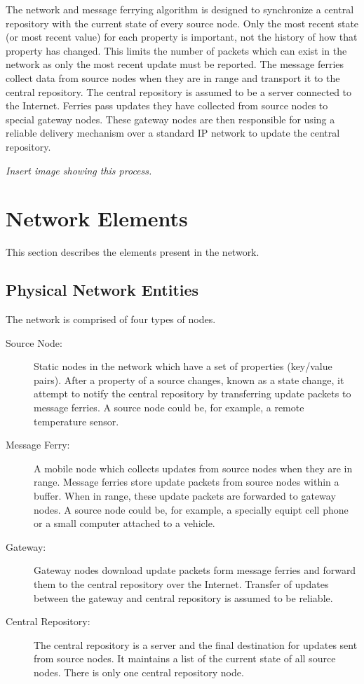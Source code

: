 The network and message ferrying algorithm is designed to synchronize a central repository with the current state of every source node.
Only the most recent state (or most recent value) for each property is important, not the history of how that property has changed.
This limits the number of packets which can exist in the network as only the most recent update must be reported.
The message ferries collect data from source nodes when they are in range and transport it to the central repository.
The central repository is assumed to be a server connected to the Internet.
Ferries pass updates they have collected from source nodes to special gateway nodes.
These gateway nodes are then responsible for using a reliable delivery mechanism over a standard IP network to update the central repository.

\emph{Insert image showing this process.}

\section{Network Elements}

This section describes the elements present in the network.

\subsection{Physical Network Entities}

The network is comprised of four types of nodes.

\begin{description}
\item[Source Node: ] 
Static nodes in the network which have a set of properties (key/value pairs).
After a property of a source changes, known as a state change, it attempt to notify the central repository by transferring update packets to message ferries.
A source node could be, for example, a remote temperature sensor.
\item[Message Ferry: ] 
A mobile node which collects updates from source nodes when they are in range.
Message ferries store update packets from source nodes within a buffer. 
When in range, these update packets are forwarded to gateway nodes.
A source node could be, for example, a specially equipt cell phone or a small computer attached to a vehicle. 
\item[Gateway: ]
Gateway nodes download update packets form message ferries and forward them to the central repository over the Internet.
Transfer of updates between the gateway and central repository is assumed to be reliable. 
\item[Central Repository: ] 
The central repository is a server and the final destination for updates sent from source nodes.
It maintains a list of the current state of all source nodes.
There is only one central repository node.
\end{description}


